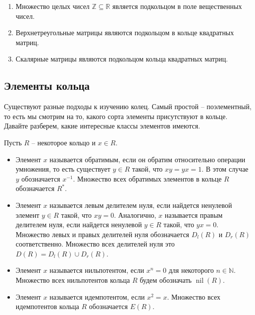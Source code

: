 \begin{examples}
\begin{enumerate}
\item Множество целых чисел $\mathbb Z\subseteq \mathbb R$ является подкольцом в поле вещественных чисел.

\item Верхнетреугольные матрицы являются подкольцом в кольце квадратных матриц.

\item Скалярные матрицы являются подкольцом кольца квадратных матриц.
\end{enumerate}
\end{examples}

\subsection{Элементы кольца}

Существуют разные подходы к изучению колец.
Самый простой -- поэлементный, то есть мы смотрим на то, какого сорта элементы присутствуют в кольце.
Давайте разберем, какие интересные классы элементов имеются.

\begin{definition}
Пусть $R$ -- некоторое кольцо и $x\in R$.
\begin{itemize}
\item Элемент $x$ называется обратимым, если он обратим относительно операции умножения, то есть существует $y\in R$ такой, что $xy = yx = 1$.
В этом случае $y$ обозначается $x^{-1}$.
Множество всех обратимых элементов в кольце $R$ обозначается $R^*$.

\item Элемент $x$ называется левым делителем нуля, если найдется ненулевой элемент $y\in R$ такой, что $xy = 0$.
Аналогично, $x$ называется правым делителем нуля, если найдется ненулевой $y\in R$ такой, что $yx = 0$.
Множество левых и правых делителей нуля обозначается  $D_l(R)$ и $D_r(R)$ соответственно.
Множество всех делителей нуля это $D(R) = D_l(R) \cup D_r(R)$.

\item Элемент $x$ называется нильпотентом, если $x^n = 0$ для некоторого $n\in \mathbb N$.
Множество всех нильпотентов кольца $R$ будем обозначать $\operatorname{nil}(R)$.

\item Элемент $x$ называется идемпотентом, если $x^2 = x$.
Множество всех идемпотентов кольца $R$ обозначается $E(R)$.
\end{itemize}
\end{definition}

